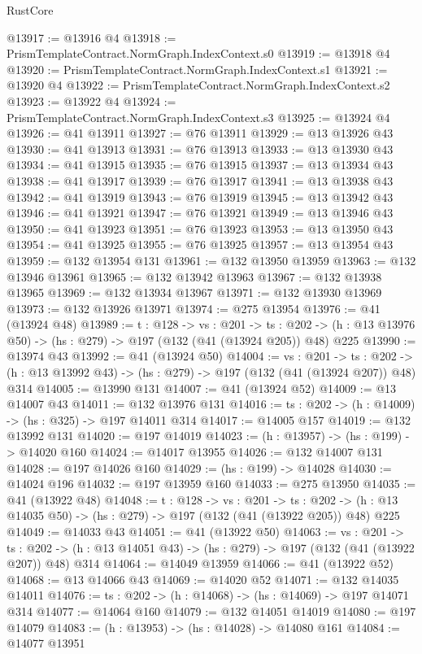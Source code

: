 \begin{lexlean}{RustCore}
\begin{coremodule}
@13917 := @13916 @4
@13918 := PrismTemplateContract.NormGraph.IndexContext.s0
@13919 := @13918 @4
@13920 := PrismTemplateContract.NormGraph.IndexContext.s1
@13921 := @13920 @4
@13922 := PrismTemplateContract.NormGraph.IndexContext.s2
@13923 := @13922 @4
@13924 := PrismTemplateContract.NormGraph.IndexContext.s3
@13925 := @13924 @4
@13926 := @41 @13911
@13927 := @76 @13911
@13929 := @13 @13926 @43
@13930 := @41 @13913
@13931 := @76 @13913
@13933 := @13 @13930 @43
@13934 := @41 @13915
@13935 := @76 @13915
@13937 := @13 @13934 @43
@13938 := @41 @13917
@13939 := @76 @13917
@13941 := @13 @13938 @43
@13942 := @41 @13919
@13943 := @76 @13919
@13945 := @13 @13942 @43
@13946 := @41 @13921
@13947 := @76 @13921
@13949 := @13 @13946 @43
@13950 := @41 @13923
@13951 := @76 @13923
@13953 := @13 @13950 @43
@13954 := @41 @13925
@13955 := @76 @13925
@13957 := @13 @13954 @43
@13959 := @132 @13954 @131
@13961 := @132 @13950 @13959
@13963 := @132 @13946 @13961
@13965 := @132 @13942 @13963
@13967 := @132 @13938 @13965
@13969 := @132 @13934 @13967
@13971 := @132 @13930 @13969
@13973 := @132 @13926 @13971
@13974 := @275 @13954
@13976 := @41 (@13924 @48)
@13989 := {t : @128} ->
  {vs : @201} ->
  {ts : @202} -> (h : @13 @13976 @50) -> (hs : @279) -> @197 (@132 (@41 (@13924 @205)) @48) @225
@13990 := @13974 @43
@13992 := @41 (@13924 @50)
@14004 := {vs : @201} ->
  {ts : @202} -> (h : @13 @13992 @43) -> (hs : @279) -> @197 (@132 (@41 (@13924 @207)) @48) @314
@14005 := @13990 @131
@14007 := @41 (@13924 @52)
@14009 := @13 @14007 @43
@14011 := @132 @13976 @131
@14016 := {ts : @202} -> (h : @14009) -> (hs : @325) -> @197 @14011 @314
@14017 := @14005 @157
@14019 := @132 @13992 @131
@14020 := @197 @14019
@14023 := (h : @13957) -> (hs : @199) -> @14020 @160
@14024 := @14017 @13955
@14026 := @132 @14007 @131
@14028 := @197 @14026 @160
@14029 := (hs : @199) -> @14028
@14030 := @14024 @196
@14032 := @197 @13959 @160
@14033 := @275 @13950
@14035 := @41 (@13922 @48)
@14048 := {t : @128} ->
  {vs : @201} ->
  {ts : @202} -> (h : @13 @14035 @50) -> (hs : @279) -> @197 (@132 (@41 (@13922 @205)) @48) @225
@14049 := @14033 @43
@14051 := @41 (@13922 @50)
@14063 := {vs : @201} ->
  {ts : @202} -> (h : @13 @14051 @43) -> (hs : @279) -> @197 (@132 (@41 (@13922 @207)) @48) @314
@14064 := @14049 @13959
@14066 := @41 (@13922 @52)
@14068 := @13 @14066 @43
@14069 := @14020 @52
@14071 := @132 @14035 @14011
@14076 := {ts : @202} -> (h : @14068) -> (hs : @14069) -> @197 @14071 @314
@14077 := @14064 @160
@14079 := @132 @14051 @14019
@14080 := @197 @14079
@14083 := (h : @13953) -> (hs : @14028) -> @14080 @161
@14084 := @14077 @13951

\end{coremodule}
\end{lexlean}
